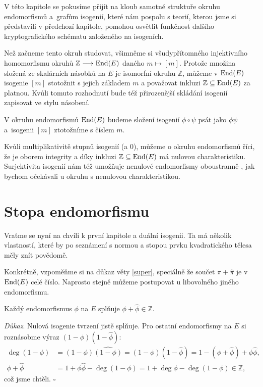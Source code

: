 \documentclass[12pt]{report}
\begin{document}
V této kapitole se pokusíme přijít na kloub samotné struktuře okruhu endomorfismů a~grafům isogenií, které nám pospolu s teorií, kterou jsme si představili v předchozí kapitole, pomohou osvětlit funkčnost dalšího kryptografického schématu založeného na isogeních.

Než začneme tento okruh studovat, všimněme si všudypřítomného injektivního homomorfismu okruhů $\mathbb{Z} \longrightarrow \operatorname{End}(E)$ daného $m \mapsto [m]$. Protože množina složená ze skalárních násobků na $E$ je isomorfní okruhu $\mathbb{Z}$, můžeme v $\operatorname{End}(E)$ isogenie $[m]$ stotožnit s jejich základem $m$ a považovat inkluzi $\mathbb{Z} \subseteq \operatorname{End}(E)$ za platnou. Kvůli tomuto rozhodnutí bude též přirozenější skládání isogenií zapisovat ve stylu násobení.

\begin{umluva}
V okruhu endomorfismů $\operatorname{End}(E)$ budeme složení isogenií $\phi \circ \psi$ psát jako $\phi \psi$ a~isogenii $[m]$ ztotožníme s číslem $m$.
\end{umluva}


Kvůli multiplikativitě stupnů isogenií (a $0$), můžeme o okruhu endomorfismů říci, že je oborem integrity a díky inkluzi $\mathbb{Z} \subseteq \operatorname{End}(E)$ má nulovou charakteristiku. Surjektivita isogenií nám též umožňuje nenulové endomorfismy oboustranně , jak bychom očekávali u okruhu s nenulovou charakteristikou.

\section{Stopa endomorfismu}

Vraťme se nyní na chvíli k první kapitole a duální isogenii. Ta má několik vlastností, které by po seznámení s normou a stopou prvku kvadratického tělesa měly znít povědomě.

Konkrétně, vzpoměňme si na důkaz věty \ref{super}, speciálně že součet $\pi+\widehat{\pi}$ je v $\operatorname{End}(E)$ celé číslo. Naprosto stejně můžeme postupovat u libovolného jiného endomorfismu.
\begin{veta}
Každý endomorfismus $\phi$ na $E$ splňuje $\phi+\widehat{\phi} \in \mathbb{Z}$.
\end{veta}
\noindent \textit{Důkaz}.  Nulová isogenie tvrzení jistě splňuje. Pro ostatní endomorfismy na $E$ si roznásobme výraz $(1 - \phi)(1 - \widehat{\phi})$:
\begin{align*}
\deg (1-\phi) &= (1-\phi)\widehat{(1-\phi)} = (1-\phi)(1-\widehat{\phi}) = 1-(\phi+\widehat{\phi})+\phi \widehat{\phi},\\
\phi+\widehat{\phi} &= 1 + \phi \widehat{\phi} - \deg (1-\phi) = 1 + \deg \phi - \deg (1-\phi) \in \mathbb{Z},
\end{align*}
což jsme chtěli. \hfill $\square$\\
\end{document}
